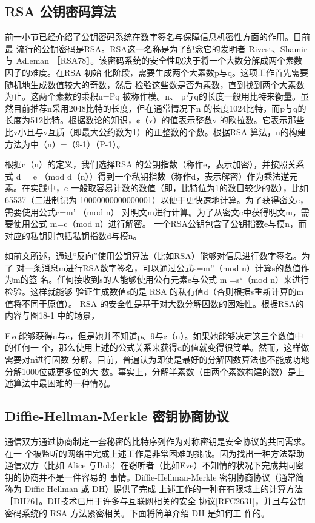 \subsection{RSA 公钥密码算法}

前一小节已经介绍了公钥密码系统在数字签名与保障信息机密性方面的作用。目前最
流行的公钥密码是RSA。RSA这一名称是为了纪念它的发明者 Rivest、Shamir 与 Adleman
［RSA78］。该密码系统的安全性取决于将一个大数分解成两个素数因子的难度。在RSA 初始
化阶段，需要生成两个大素数p与q。这项工作首先需要随机地生成数值较大的奇数，然后
检验这些数是否为素数，直到找到两个大素数为止。这两个素数的乘积n=Pq 被称作模。n、
p与q的长度一般用比特来衡量。虽然目前推荐n采用2048比特的长度，但在通常情况下n
的长度1024比特，而p与q的长度为512比特。根据数论的知识，¢（v）的值表示整数v
的欧拉数。它表示那些比v小且与v互质（即最大公约数为1）的正整数的个数。根据RSA
算法，n的构建方法为中（n）=（9-1）（P-1）。

根据¢（n）的定义，我们选择RSA 的公钥指数（称作e，表示加密），并按照关系式
d = e （mod d（n））得到一个私钥指数（称作d，表示解密）作为乘法逆元素。在实践中，e
一般取容易计数的数值（即，比特位为1的数目较少的数），比如65537（二进制记为
10000000000000001）以便于更快速地计算。为了获得密文c，需要使用公式c=m' （mod n）
对明文m进行计算。为了从密文c中获得明文m，需要使用公式 m=c（mod n）进行解密。
一个RSA公钥包含了公钥指数e与模n，而对应的私钥则包括私钥指数d与模n。

如前文所述，通过“反向”使用公钥算法（比如RSA）能够对信息进行数字签名。为了
对一条消息m进行RSA数字签名，可以通过公式s=m”（mod n）计算s的数值作为m的签
名。任何接收到s的人能够使用公有元素e与公式 m =s°（mod n）来进行检验。这样就能够
验证生成数值s的是 RSA 的私有值d（杏则根据s重新计算的m 值将不同于原值）。
RSA 的安全性是基于对大数分解因数的困难性。根据RSA的内容与图18-1 中的场景，

Eve能够获得n与e，但是她并不知道p、9与¢（n）。如果她能够决定这三个数值中的任何一
个，那么使用上述的公式关系来获得d的值就变得很简单。然而，这样做需要对n进行因数
分解。目前，普遍认为即使是最好的分解因数算法也不能成功地分解1000位或更多位的大
数。事实上，分解半素数（由两个素数构建的数）是上述算法中最困难的一种情况。

\subsection{Diffie-Hellman-Merkle 密钥协商协议}

通信双方通过协商制定一套秘密的比特序列作为对称密钥是安全协议的共同需求。在一
个被监听的网络中完成上述工作是非常困难的挑战。因为找出一种方法帮助通信双方（比如
Alice 与Bob）在窃听者（比如Eve）不知情的状况下完成共同密钥的协商并不是一件容易的
事情。Diffie-Hellman-Merkle 密钥协商协议（通常简称为 Diffie-Hellman 或 DH）提供了完成
上述工作的一种在有限域上的计算方法［DH76］\footnotemark。DH技术已用于许多与互联网相关的安全
协议\href{https://www.rfc-editor.org/rfc/rfc2631}{[RFC2631]}，并且与公钥密码系统的 RSA 方法紧密相关。下面将简单介绍 DH 是如何工
作的。

